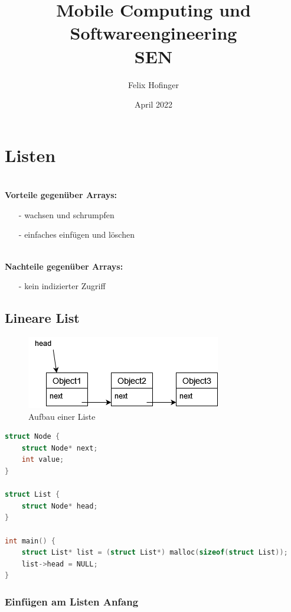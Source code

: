 \documentclass{article}
\title{Mobile Computing und Softwareengineering \\ SEN}
\author{Felix Hofinger}
\date{April 2022}
\begin{document}
\maketitle
\newpage
\tableofcontents
\newpage

\section{Listen}

\hfill\\
{\bf Vorteile gegenüber Arrays:}
\begin{itemize}
  \item[-] wachsen und schrumpfen
  \item[-] einfaches einfügen und löschen
\end{itemize}

\hfill\\
{\bf Nachteile gegenüber Arrays:}
\begin{itemize}
  \item[-] kein indizierter Zugriff

\end{itemize}

\subsection{Lineare List}

\begin{figure}[h!]
  \centering
  \includegraphics[scale=0.6]{list_structure.png}
  \caption{Aufbau einer Liste}
  \label{fig:list_structure}
\end{figure}

\begin{lstlisting}[language=c, tabsize=4]
struct Node {
    struct Node* next;
    int value;
}

struct List {
    struct Node* head;
}

int main() {
    struct List* list = (struct List*) malloc(sizeof(struct List));
    list->head = NULL;
}
\end{lstlisting}
\newpage

\subsubsection{Einfügen am Listen Anfang}
\end{document}
